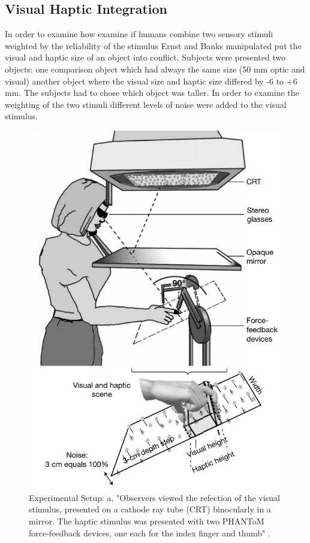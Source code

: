 \documentclass{SeminarV2}
\begin{document}
\subsection{Visual Haptic Integration}
In order to examine how examine if humans combine two sensory stimuli weighted by the reliability of the stimulus Ernst and Banks manipulated put the visual and haptic size of an object into conflict. Subjects were presented two objects: one comparison object which had always the same size (50 mm optic and visual) another object where the visual size and haptic size differed by -6 to +6 mm. The subjects had to chose which object was taller. In order to examine the weighting of the two stimuli different levels of noise were added to the visual stimulus.


\begin{figure}
	\includegraphics[width=0.65\linewidth]{erns_new.png}

	
	\caption{Experimental Setup: a, "Observers viewed the refection of the visual stimulus,
		presented on a cathode ray tube (CRT) binocularly in a mirror. The haptic stimulus was presented with two PHANToM force-feedback devices, one each
		for the index finger and thumb" \cite{ernst2002humans}.}
	\label{fig:boat1}
\end{figure}




\FloatBarrier
\end{document}
